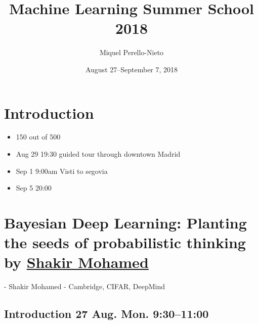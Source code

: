 \documentclass[b5paper]{report}
\title{Machine Learning Summer School 2018}
\author{Miquel Perello-Nieto}
\date{August 27--September 7, 2018}
\begin{document}
\maketitle
\tableofcontents

%



\printglossary[type=\acronymtype] %
\printglossary[type=main] %


\chapter{Introduction}

\begin{itemize}
  \item 150 out of 500
  \item Aug 29 19:30 guided tour through downtown Madrid
  \item Sep 1 9:00am Visti to segovia
  \item Sep 5 20:00
\end{itemize}

\chapter{Bayesian Deep Learning: Planting the seeds of probabilistic thinking
by \href{https://shakirm.com/}{Shakir Mohamed}}

- Shakir Mohamed
- Cambridge, CIFAR, DeepMind

\section{Introduction 27 Aug. Mon. 9:30--11:00}
\end{document}
